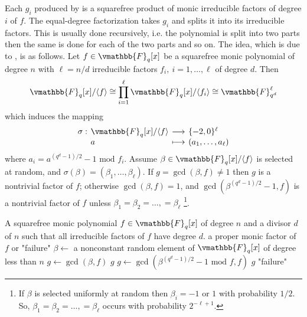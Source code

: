 Each $g_i$ produced by  is a squarefree product of monic irreducible 
factors of degree $i$ of $f$. The equal-degree factorization takes $g_i$ and splits it into its 
irreducible factors. This is usually done recursively, i.e. the polynomial is split into two parts 
then the same is done for each of the two parts and so on. The idea, which is due to 
\cite{CantorandZassenhaus1981}, is as follows. Let $f \in \vmathbb{F}_q[x]$ be a squarefree monic 
polynomial of degree $n$ with $\ell = n / d$ irreducible factors $f_i, \: i = 1, \dots, \ell$ of 
degree $d$. Then
$$
\vmathbb{F}_q[x] / \langle f \rangle \cong \prod_{i = 1}^{\ell} \vmathbb{F}_q[x] / \langle f_i \rangle 
\cong \vmathbb{F}_{q^d}^\ell
$$
which induces the mapping 
$$
\setlength\arraycolsep{2pt}
\begin{array}{llll}
\sigma: & \vmathbb{F}_q[x] / \langle f \rangle & \longrightarrow & \{-2, 0\}^{\ell}\\
& a & \longmapsto & (a_1, \dots, a_{\ell})
\end{array}
$$
where $a_i = a^{(q^d - 1) / 2} - 1 \text{ mod } f_i$. Assume $\beta \in \vmathbb{F}_q[x] / \langle f 
\rangle$ is selected at random, and $\sigma(\beta) = (\beta_1, \dots, \beta_\ell)$. If $g = 
\gcd(\beta, f) \ne 1$ then $g$ is a nontrivial factor of $f$; otherwise $\gcd(\beta, f) = 1$, and 
$\gcd(\beta^{(q^d - 1) / 2} - 1, f)$ is a nontrivial factor of $f$ unless $\beta_1 = \beta_2 = 
\dots, = \beta_\ell$ \footnote{If $\beta$ is selected uniformly at random then $\beta_i = -1$ or $1$ 
with probability $1/2$. So, $\beta_1 = \beta_2 = \dots, = \beta_\ell$ occurs with probability 
$2^{-\ell + 1}$.}. 

\begin{algorithm}
\label{algorithm:EDS}
\begin{algorithmic}[1]
\REQUIRE A squarefree monic polynomial $f \in \vmathbb{F}_q[x]$ of degree $n$ and a divisor $d$ of 
$n$ such that all irreducible factors of $f$ have degree $d$.
\ENSURE a proper monic factor of $f$ or "failure"
\STATE $\beta \leftarrow$ a nonconstant random element of $\vmathbb{F}_q[x]$ of degree less than $n$
\STATE $g \leftarrow \gcd(\beta, f)$
	\RETURN $g$ 
\ENDIF
\STATE $g \leftarrow \gcd(\beta^{(q^d - 1) / 2} - 1 \text{ mod } f, f)$
\label{step:EDS-main}
	\RETURN $g$ 
\ELSE
	\RETURN "failure"
\ENDIF
\end{algorithmic}
\end{algorithm}
 
